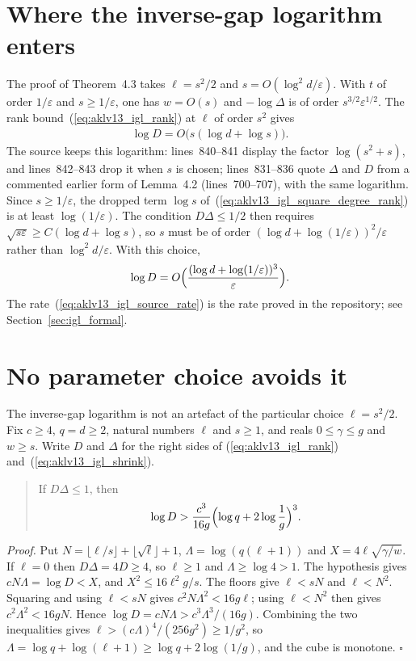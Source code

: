\documentclass{article}
\begin{document}
\section{Where the inverse-gap logarithm enters}

The proof of Theorem~4.3 takes $\ell=s^2/2$ and $s=O(\log^2d/\varepsilon)$.
With $t$ of order $1/\varepsilon$ and $s\ge1/\varepsilon$, one has
$w=O(s)$ and $-\log\Delta$ is of order $s^{3/2}\varepsilon^{1/2}$. The rank
bound~(\ref{eq:aklv13_igl_rank}) at $\ell$ of order $s^2$ gives
\begin{align}
    \log D=O\bigl(s(\log d+\log s)\bigr).
    \label{eq:aklv13_igl_square_degree_rank}
\end{align}
The source keeps this logarithm: lines~840--841 display the factor
$\log(s^2+s)$, and lines~842--843 drop it when $s$ is chosen;
lines~831--836 quote $\Delta$ and $D$ from a commented earlier form of
Lemma~4.2 (lines~700--707), with the same logarithm. Since
$s\ge1/\varepsilon$, the dropped term $\log s$
of~(\ref{eq:aklv13_igl_square_degree_rank}) is at least
$\log(1/\varepsilon)$. The condition $D\Delta\le1/2$ then requires
$\sqrt{s\varepsilon}\ge C(\log d+\log s)$, so $s$ must be of order
$(\log d+\log(1/\varepsilon))^2/\varepsilon$ rather than
$\log^2d/\varepsilon$. With this choice,
\begin{align}
    \log D=O\Bigl(\frac{(\log d+\log(1/\varepsilon))^3}{\varepsilon}\Bigr).
    \label{eq:aklv13_igl_source_rate}
\end{align}
The rate~(\ref{eq:aklv13_igl_source_rate}) is the rate proved in the
repository; see Section~\ref{sec:igl_formal}.

\section{No parameter choice avoids it}

The inverse-gap logarithm is not an artefact of the particular choice
$\ell=s^2/2$. Fix $c\ge4$, $q=d\ge2$, natural numbers $\ell$ and $s\ge1$,
and reals $0\le\gamma\le g$ and $w\ge s$. Write $D$ and $\Delta$ for the right
sides of (\ref{eq:aklv13_igl_rank}) and~(\ref{eq:aklv13_igl_shrink}).
\begin{quote}
    If $D\Delta\le1$, then
    \begin{align}
        \log D>\frac{c^3}{16g}\Bigl(\log q+2\log\frac1g\Bigr)^3.
        \label{eq:aklv13_igl_lower}
    \end{align}
\end{quote}
\emph{Proof.} Put $N=\lfloor\ell/s\rfloor+\lfloor\sqrt\ell\rfloor+1$,
$\Lambda=\log(q(\ell+1))$ and $X=4\ell\sqrt{\gamma/w}$. If $\ell=0$ then
$D\Delta=4D\ge4$, so $\ell\ge1$ and $\Lambda\ge\log4>1$. The hypothesis gives
$cN\Lambda=\log D<X$, and $X^2\le16\ell^2g/s$. The floors give $\ell<sN$ and
$\ell<N^2$. Squaring and using $\ell<sN$ gives
$c^2N\Lambda^2<16g\ell$; using $\ell<N^2$ then gives
$c^2\Lambda^2<16gN$. Hence $\log D=cN\Lambda>c^3\Lambda^3/(16g)$. Combining
the two inequalities gives $\ell>(c\Lambda)^4/(256g^2)\ge1/g^2$, so
$\Lambda=\log q+\log(\ell+1)\ge\log q+2\log(1/g)$, and the cube is monotone.
\hfill$\square$
\end{document}
